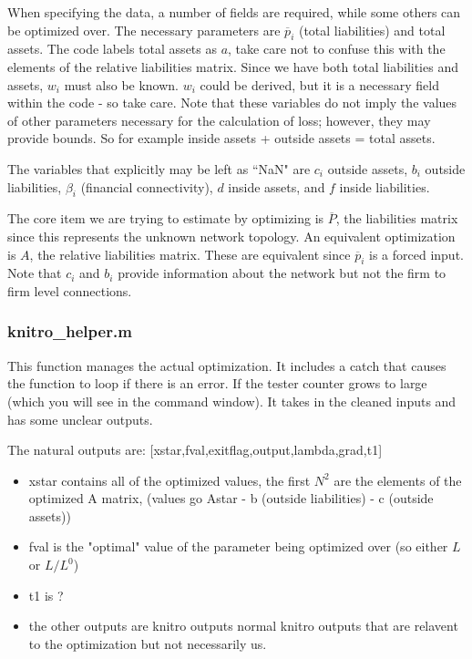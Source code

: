 \documentclass{article}
\newcommand{\?}{\stackrel{?}{=}}
\newcommand{\pbar}{\overline{p}}
\newcommand{\Pbar}{\overline{P}}
\begin{document}
When specifying the data, a number of fields are required, while some others can be optimized over. The necessary parameters are $\pbar_i$ (total liabilities) and total assets. The code labels total assets as $a$, take care not to confuse this with the elements of the relative liabilities matrix. Since we have both total liabilities and assets, $w_i$ must also be known. $w_i$ could be derived, but it is a necessary field within the code - so take care. Note that these variables do not imply the values of other parameters necessary for the calculation of loss; however, they may provide bounds. So for example inside assets + outside assets = total assets.

The variables that explicitly may be left as ``NaN" are $c_i$ outside assets, $b_i$ outside liabilities, $\beta_i$ (financial connectivity), $d$ inside assets, and $f$ inside liabilities.

The core item we are trying to estimate by optimizing is $\Pbar$, the liabilities matrix since this represents the unknown network topology. An equivalent optimization is $A$, the relative liabilities matrix. These are equivalent since $\pbar_i$ is a forced input. Note that $c_i$ and $b_i$ provide information about the network but not the firm to firm level connections. 

\subsubsection{knitro\_helper.m}

This function manages the actual optimization. It includes a catch that causes the function to loop if there is an error. If the tester counter grows to large (which you will see in the command window). It takes in the cleaned inputs and has some unclear outputs. 

The natural outputs are: [xstar,fval,exitflag,output,lambda,grad,t1]
\begin{itemize}
\item xstar contains all of the optimized values, the first $N^2$ are the elements of the optimized A matrix, (values go Astar - b (outside liabilities) - c (outside assets))
\item fval is the "optimal" value of the parameter being optimized over (so either $L$ or $L/L^0$)
\item t1 is ?
\item the other outputs are knitro outputs normal knitro outputs that are relavent to the optimization but not necessarily us.
\end{itemize}
\end{document}
